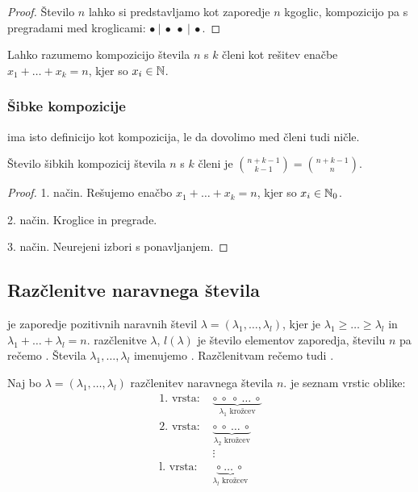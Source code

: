 \begin{proof}
    Število $n$ lahko si predstavljamo kot zaporedje $n$ kgoglic, kompozicijo pa s pregradami med kroglicami: $\bullet~|~\bullet~\bullet~|~\bullet$.
\end{proof}

\begin{opomba}
    Lahko razumemo kompozicijo števila $n$ s $k$ členi kot rešitev enačbe $x_1 + \ldots + x_k = n$, kjer so $x_i \in \mathbb{N}$.
\end{opomba}

\subsubsection{Šibke kompozicije}
\begin{definicija}
     ima isto definicijo kot kompozicija, le da dovolimo med členi tudi ničle.
\end{definicija}

\begin{trditev}
    Število šibkih kompozicij števila $n$ s $k$ členi je $\binom{n+k-1}{k-1} = \binom{n+k-1}{n}$.
\end{trditev}

\begin{proof}
    1. način. Rešujemo enačbo $x_1 + \ldots + x_k = n$, kjer so $x_i \in \mathbb{N}_0$.

    2. način. Kroglice in pregrade.

    3. način. Neurejeni izbori s ponavljanjem.
\end{proof}

\subsection{Razčlenitve naravnega števila}
\begin{definicija}
     je zaporedje pozitivnih naravnih števil $\lambda = (\lambda_1, \ldots, \lambda_l)$, kjer je $\lambda_1 \geq \ldots \geq \lambda_l$ in $\lambda_1 + \ldots + \lambda_l = n$.  razčlenitve $\lambda$, $l(\lambda)$ je število elementov zaporedja, številu $n$ pa rečemo . Števila $\lambda_1, \ldots, \lambda_l$ imenujemo . Razčlenitvam rečemo tudi .
\end{definicija}

\begin{definicija}
    Naj bo $\lambda = (\lambda_1, \ldots, \lambda_l)$ razčlenitev naravnega števila $n$.  je seznam vrstic oblike:
    \begin{align*}
        \text{1. vrsta: } &\underbrace{\circ \ \circ \ \circ \ \ldots \ \circ}_{\lambda_1 \text{ krožcev}} \\
        \text{2. vrsta: } &\underbrace{\circ \ \circ \ \ldots \ \circ}_{\lambda_2 \text{ krožcev}} \\
        &\vdots \\
        \text{l. vrsta: } &\underbrace{\circ \ \ldots \ \circ}_{\lambda_l \text{ krožcev}}
    \end{align*}
\end{definicija}

